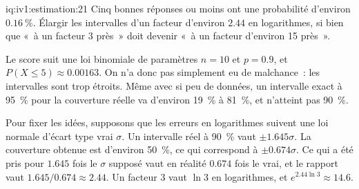 \begin{solution}{iq:iv1:estimation:21}
Cinq bonnes réponses ou moins ont une probabilité d'environ $0.16~\%$. Élargir les intervalles d'un facteur d'environ $2.44$ en logarithmes, si bien que «~à un facteur 3 près~» doit devenir «~à un facteur d'environ 15 près~».

Le score suit une loi binomiale de paramètres $n = 10$ et $p = 0.9$, et $P(X \le 5) \approx 0.00163$. On n'a donc pas simplement eu de malchance~: les intervalles sont trop étroits. Même avec si peu de données, un intervalle exact à 95~\% pour la couverture réelle va d'environ 19~\% à 81~\%, et n'atteint pas 90~\%.

Pour fixer les idées, supposons que les erreurs en logarithmes suivent une loi normale d'écart type vrai $\sigma$. Un intervalle réel à 90~\% vaut $\pm 1.645\sigma$. La couverture obtenue est d'environ 50~\%, ce qui correspond à $\pm 0.674\sigma$. Ce qui a été pris pour $1.645$ fois le $\sigma$ supposé vaut en réalité $0.674$ fois le vrai, et le rapport vaut $1.645/0.674 \approx 2.44$. Un facteur 3 vaut $\ln 3$ en logarithmes, et $e^{2.44 \ln 3} \approx 14.6$.

\end{solution}

